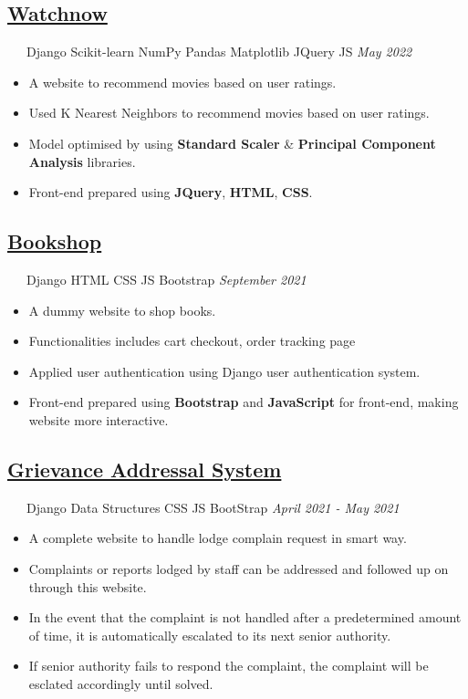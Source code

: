 \documentclass[12pt]{article}
\newcommand{\sbullet}{\raisebox{0.35ex}{\tiny$\bullet$}\hspace*{3pt}}
\begin{document}
\subsection*{\href{https://github.com/prabhavagrawal7/watchnow/}{Watchnow}}~~~Django \sbullet Scikit-learn \sbullet NumPy \sbullet Pandas \sbullet Matplotlib \sbullet JQuery \sbullet JS \hfill\textit{May 2022}\\
\begin{itemize}[topsep=1pt, itemsep=1pt, partopsep=1pt, parsep=1pt]
	\item A website to recommend movies based on user ratings. 
	\item Used K Nearest Neighbors to recommend movies based on user ratings.
	\item Model optimised by using \textbf{Standard Scaler} \& \textbf{Principal Component Analysis} libraries. 
	\item Front-end prepared using \textbf{JQuery}, \textbf{HTML}, \textbf{CSS}.
\end{itemize}

\subsection*{\href{https://github.com/prabhavagrawal7/bookshop}{Bookshop}}~~~Django \sbullet HTML \sbullet CSS \sbullet JS \sbullet Bootstrap \hfill\textit{September 2021}\\
\begin{itemize}[topsep=1pt, itemsep=1pt, partopsep=1pt, parsep=1pt]
	\item A dummy website to shop books.
	\item Functionalities includes cart checkout, order tracking page
	\item Applied user authentication using Django user authentication system.
	\item Front-end prepared using \textbf{Bootstrap} and \textbf{JavaScript} for front-end, making website more interactive.
\end{itemize}

\subsection*{\href{https://github.com/prabhavagrawal7/grievance-addressal-system}{Grievance Addressal System}}~~~Django \sbullet Data Structures \sbullet CSS \sbullet JS \sbullet BootStrap \hfill \textit{April 2021 - May 2021} \\
\begin{itemize}[topsep=0pt,itemsep=1pt,partopsep=1pt, parsep=1pt]
	\item A complete website to handle lodge complain request in smart way. 
	\item Complaints or reports lodged by staff can be addressed and followed up on through this website.
	\item In the event that the complaint is not handled after a predetermined amount of time, it is automatically escalated to its next senior authority.
	\item If senior authority fails to respond the complaint, the complaint will be esclated accordingly until solved. 
\end{itemize}
\end{document}
